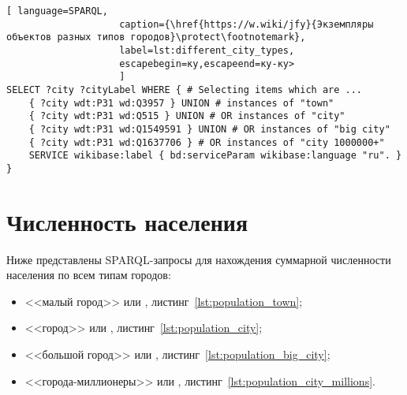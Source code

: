 \begin{lstlisting}[ language=SPARQL, 
                    caption={\href{https://w.wiki/jfy}{Экземпляры объектов разных типов городов}\protect\footnotemark},
                    label=lst:different_city_types, 
                    escapebegin=ку,escapeend=ку-ку>
                    ]
SELECT ?city ?cityLabel WHERE { # Selecting items which are ...
	{ ?city wdt:P31 wd:Q3957 } UNION # instances of "town"
	{ ?city wdt:P31 wd:Q515 } UNION # OR instances of "city"
	{ ?city wdt:P31 wd:Q1549591 } UNION # OR instances of "big city"
	{ ?city wdt:P31 wd:Q1637706 } # OR instances of "city 1000000+"                                
	SERVICE wikibase:label { bd:serviceParam wikibase:language "ru". }
}
\end{lstlisting}


\section{Численность населения}

Ниже представлены SPARQL-запросы для нахождения суммарной численности населения по всем типам городов: 
\begin{itemize}
	\item <<малый город>> или , листинг~\ref{lst:population_town};
	\item <<город>> или , листинг~\ref{lst:population_city};
	\item <<большой город>> или , листинг~\ref{lst:population_big_city};
	\item <<города-миллионеры>> или , листинг~\ref{lst:population_city_millions}.
\end{itemize}



